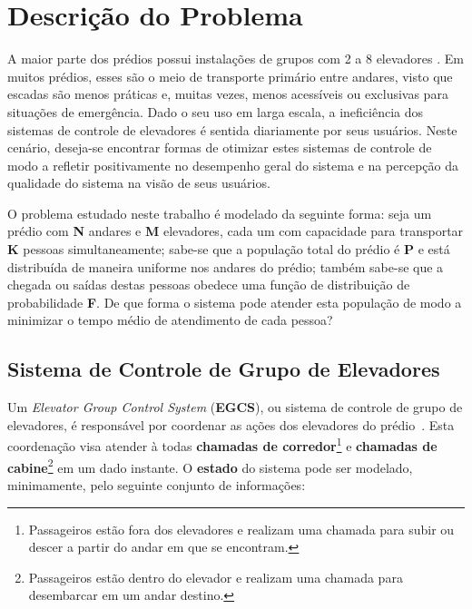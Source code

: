 \chapter{\label{chap:problem}Descrição do Problema}

A maior parte dos prédios possui instalações de grupos com 2 a 8 elevadores \cite{KOEHLEROTTIGER02}. Em muitos prédios, esses são o meio de transporte primário entre andares, visto que escadas são menos práticas e, muitas vezes, menos acessíveis ou exclusivas para situações de emergência. Dado o seu uso em larga escala, a ineficiência dos sistemas de controle de elevadores é sentida diariamente por seus usuários. Neste cenário, deseja-se encontrar formas de otimizar estes sistemas de controle de modo a refletir positivamente no desempenho geral do sistema e na percepção da qualidade do sistema na visão de seus usuários.

O problema estudado neste trabalho é modelado da seguinte forma: seja um prédio com \textbf{N} andares e \textbf{M} elevadores, cada um com capacidade para transportar \textbf{K} pessoas simultaneamente; sabe-se que a população total do prédio é \textbf{P} e está distribuída de maneira uniforme nos andares do prédio; também sabe-se que a chegada ou saídas destas pessoas obedece uma função de distribuição de probabilidade \textbf{F}. De que forma o sistema pode atender esta população de modo a minimizar o tempo médio de atendimento de cada pessoa?

\section{Sistema de Controle de Grupo de Elevadores}

Um \textit{Elevator Group Control System} (\textbf{EGCS}), ou sistema de controle de grupo de elevadores, é responsável por coordenar as ações dos elevadores do prédio~\cite{kuzunuki1984elevator}. Esta coordenação visa atender à todas \textbf{chamadas de corredor}\footnote{Passageiros estão fora dos elevadores e realizam uma chamada para subir ou descer a partir do andar em que se encontram.} e \textbf{chamadas de cabine}\footnote{Passageiros estão dentro do elevador e realizam uma chamada para desembarcar em um andar destino.} em um dado instante. O \textbf{estado} do sistema pode ser modelado, minimamente, pelo seguinte conjunto de informações:

